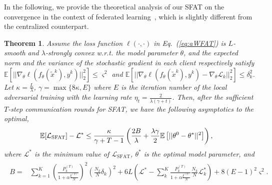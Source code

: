 \documentclass{article} %
\newcommand{\xadv}{\tilde{{x}}}
\theoremstyle{plain}
\newtheorem{theorem}{Theorem}[section]
\theoremstyle{definition}
\theoremstyle{remark}
\begin{document}
In the following, we provide the theoretical analysis of our SFAT on the convergence in the context of federated learning~\citep{li2019convergence}, which is slightly different from the centralized counterpart. 
\setlength{\intextsep}{0pt}
\begin{theorem}
\label{the:awfat-convergence}
Assume the loss function $\ell(\cdot, \cdot)$ in Eq.~(\ref{eq:aWFAT}) is $L$-smooth and $\lambda$-strongly convex \textit{w.r.t.} the model parameter $\theta$, and the expected norm and the variance of the stochastic gradient in each client respectively satisfy $\mathbb{E}\left[||\nabla_\theta\ell(f_{\theta}(\xadv^k), y^k)||^2_2\right]\leq \varsigma^2$ and $\mathbb{E}\left[||\nabla_\theta\ell(f_{\theta}(\xadv^k), y^k)-\nabla_\theta \mathcal{L}_k||^2_2\right]\leq \delta^2_k$. Let $\kappa=\frac{L}{\lambda}$, $\gamma=\max\{8\kappa, E\}$ where $E$ is the iteration number of the local adversarial training with the learning rate $\eta_{t}=\frac{2}{\lambda(\gamma+t)}$. Then, after the sufficient $T$-step communication rounds for SFAT, we have the following asymptotics to the optimal,
\begin{align} \label{eq:awfat-convergence}
\vspace{-3mm}
    \begin{split}
        \mathbb{E}[\mathcal{L}&_{\text{SFAT}}]-\mathcal{L}^{*} \leq\frac{\kappa}{\gamma+T-1}\left(\frac{2B}{\lambda}+\frac{\lambda\gamma}{2}\mathbb{E}\left[||\theta^0-\theta^{*}||^2\right]\right),
    \end{split}
\end{align}
where $\mathcal{L}^{*}$ is the minimum value of $\mathcal{L}_{\text{SFAT}}$, $\theta^*$ is the optimal model parameter, and 
\begin{align}\begin{split} B = &\sum_{k=1}^K \left(\frac{P_k^{(T)} }{1+\alpha\frac{\xi^{(T)}}{N} }\right)^2\left(\frac{N_k}{N}\delta_k\right)^2 +  6L\left(\mathcal{L}^{*}-\sum_k^K \frac{P_k^{(T)} }{1+\alpha\frac{\xi^{(T)}}{N}}\frac{N_k}{N}\mathcal{L}_k^*\right) + 8(E-1)^2\varsigma^2. \nonumber
\end{split}
\end{align}
\vspace{-3mm}
\end{theorem}
\end{document}
